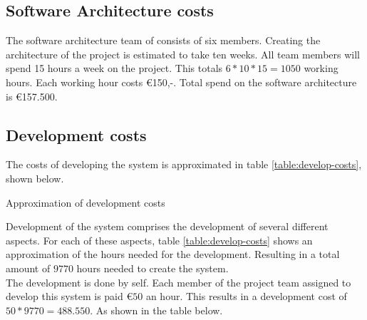 \subsection{Software Architecture costs}
The software architecture team of \CompanyName consists of six members. Creating the architecture of the project is estimated to take ten weeks. All team members will spend 15 hours a week on the project. This totals $6*10*15=1050$ working hours. Each working hour costs \euro{}150,-. Total spend on the software architecture is \euro{}157.500.
\subsection{Development costs}
The costs of developing the system is approximated in table \ref{table:develop-costs}, shown below.

\begin{table}[H]

	\caption{Approximation of development costs}
	\label{table:develop-costs}

\end{table}
Development of the system comprises the development of several different aspects. For each of these aspects, table \ref{table:develop-costs} shows an approximation of the hours needed for the development. Resulting in a total amount of $9770$ hours needed to create the system.\\
The development is done by \CompanyName self. Each member of the project team assigned to develop this system is paid $\euro{}50$ an hour. This results in a development cost of $50*9770=488.550$. As shown in the table below.


